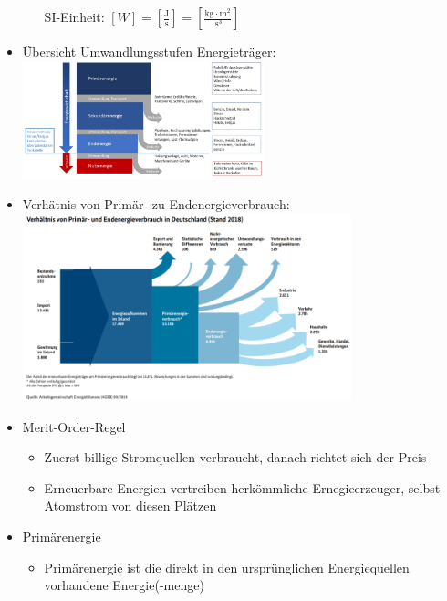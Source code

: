 \documentclass[fleqn,twoside,dvipsnames]{article}
\begin{document}
\begin{itemize}
\begin{itemize}
                            SI-Einheit: $[W]=\left[\frac{\mathrm{J}}{\mathrm{s}}\right]=\left[\frac{\mathrm{kg} \cdot \mathrm{m}^2}{\mathrm{~s}^3}\right]$
                        \end{itemize}
                    \item Übersicht Umwandlungsstufen Energieträger:\\
                            \includegraphics[width=0.55\textwidth]{Grafiken/ES/Umwandlungsstufen Energietraeger.png}\\
                    \item Verhätnis von Primär- zu Endenergieverbrauch:\\
                            \includegraphics[width=0.75\textwidth]{Grafiken/ES/Verhaeltnis Primaer zu Endenergie DE.png}\\
                    \item Merit-Order-Regel
                        \begin{itemize}
                            \item Zuerst billige Stromquellen verbraucht, danach richtet sich der Preis
                            \item Erneuerbare Energien vertreiben herkömmliche Ernegieerzeuger, selbst Atomstrom von diesen Plätzen
                        \end{itemize}
                        \newpage
                    \item Primärenergie
                        \begin{itemize}
                            \item Primärenergie ist die direkt in den ursprünglichen Energiequellen vorhandene Energie(-menge)

\end{itemize}
\end{itemize}
\end{document}
